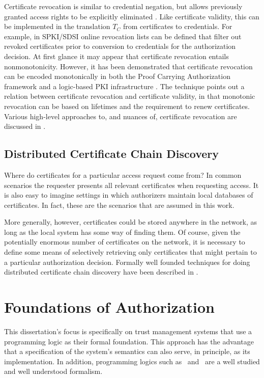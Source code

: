 Certificate revocation is similar to credential negation, but allows previously granted access
rights to be explicitly eliminated \cite{Rivest:CWECRL}. Like certificate validity, this can be
implemented in the translation $T_C$ from certificates to credentials. For example, in SPKI/SDSI
\cite{RFC-2693} online revocation lists can be defined that filter out revoked certificates
prior to conversion to credentials for the authorization decision. At first glance it may appear
that certificate revocation entails nonmonotonicity. However, it has been demonstrated that
certificate revocation can be encoded monotonically in both the Proof Carrying Authorization
framework \cite{Bauer:GFACSW} and a logic-based PKI infrastructure \cite{lbi-fc01}. The
technique points out a relation between certificate revocation and certificate validity, in that
monotonic revocation can be based on lifetimes and the requirement to renew certificates.
Various high-level approaches to, and nuances of, certificate revocation are discussed in
\cite{Rivest:CWECRL}.

\subsection{Distributed Certificate Chain Discovery}

Where do certificates for a particular access request come from? In common scenarios the
requester presents all relevant certificates when requesting access. It is also easy to imagine
settings in which authorizers maintain local databases of certificates. In fact, these are the
scenarios that are assumed in this work.

More generally, however, certificates could be stored anywhere in the network, as long as the
local system has some way of finding them. Of course, given the potentially enormous number of
certificates on the network, it is necessary to define some means of selectively retrieving only
certificates that might pertain to a particular authorization decision. Formally well founded
techniques for doing distributed certificate chain discovery have been described in
\cite{Li:DCDTM,Gunter:PDCR}.

\section{Foundations of Authorization}
\label{section-foundations}

This dissertation's focus is specifically on trust management systems that use a programming
logic as their formal foundation. This approach has the advantage that a specification of the
system's semantics can also serve, in principle, as its implementation. In addition, programming
logics such as \prolog\ and \datalog\ are a well studied and well understood formalism.

